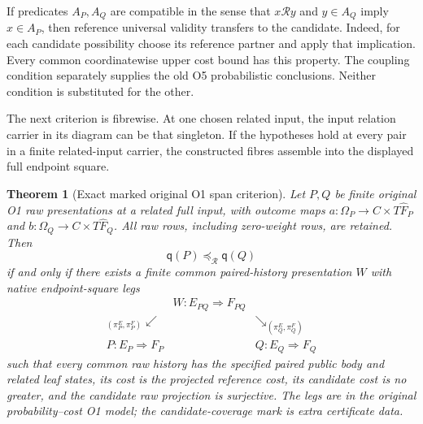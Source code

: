\documentclass[11pt,a4paper]{article}
\newtheorem{theorem}{Theorem}[section]
\theoremstyle{definition}
\newcommand{\qobs}{\mathsf{q}}
\begin{document}
If predicates $A_P,A_Q$ are compatible in the sense that
$x\mathcal R y$ and $y\in A_Q$ imply $x\in A_P$, then reference
universal validity transfers to the candidate. Indeed, for each candidate
possibility choose its reference partner and apply that implication.
Every common coordinatewise upper cost bound has this property. The
coupling condition separately supplies the old O5 probabilistic
conclusions. Neither condition is substituted for the other.

The next criterion is fibrewise. At one chosen related input, the input
relation carrier in its diagram can be that singleton. If the hypotheses
hold at every pair in a finite related-input carrier, the constructed
fibres assemble into the displayed full endpoint square.

\begin{theorem}[Exact marked original O1 span criterion]
\label{thm:span}
Let $P,Q$ be finite original O1 raw presentations at a related full input,
with outcome maps $a:\Omega_P\to C\times T\widehat F_P$ and
$b:\Omega_Q\to C\times T\widehat F_Q$. All raw rows, including
zero-weight rows, are retained. Then
\[
 \qobs(P)\preceq_{\mathcal R}\qobs(Q)
\]
if and only if there exists a finite common paired-history presentation
$W$ with native endpoint-square legs
\[
 \begin{array}{ccc}
 &W:E_{PQ}\Rightarrow F_{PQ}&\\[-2pt]
 {}_{(\pi_P^E,\pi_P^F)}\swarrow&&
          \searrow_{(\pi_Q^E,\pi_Q^F)}\\[-2pt]
 P:E_P\Rightarrow F_P&&Q:E_Q\Rightarrow F_Q
 \end{array}
\]
such that every common raw history has the specified paired public body
and related leaf states, its cost is the projected reference cost, its
candidate cost is no greater, and the candidate raw projection is
surjective. The legs are in the original probability--cost O1 model;
the candidate-coverage mark is extra certificate data.
\end{theorem}
\end{document}
